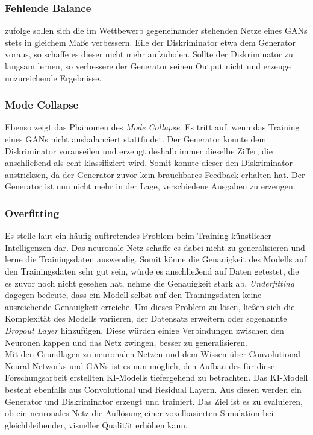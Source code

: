 \subsubsection*{Fehlende Balance}
\citet[67]{tariq_gan} zufolge sollen sich die im Wettbewerb gegeneinander stehenden Netze eines GANs stets in gleichem Maße verbessern. Eile der Diskriminator etwa dem Generator voraus, so schaffe es dieser nicht mehr aufzuholen. Sollte der Diskriminator zu langsam lernen, so verbessere der Generator seinen Output nicht und erzeuge unzureichende Ergebnisse.

\subsubsection*{Mode Collapse}
Ebenso zeigt \citet[95]{tariq_gan} das Phänomen des \textit{Mode Collapse}. Es tritt auf, wenn das Training eines GANs nicht ausbalanciert stattfindet. Der Generator konnte dem Diskriminator vorauseilen und erzeugt deshalb immer  dieselbe Ziffer, die anschließend als echt klassifiziert wird. Somit konnte dieser den Diskriminator austricksen, da der Generator zuvor kein brauchbares Feedback erhalten hat. Der Generator ist nun nicht mehr in der Lage, verschiedene Ausgaben zu erzeugen.

\subsubsection*{Overfitting} Es stelle laut \citet[]{baheti-2022} ein häufig auftretendes Problem beim Training künstlicher Intelligenzen dar. Das neuronale Netz schaffe es dabei nicht zu generalisieren und lerne die Trainingsdaten auswendig. Somit könne die Genauigkeit des Modells auf den Trainingsdaten sehr gut sein, würde es anschließend auf Daten getestet, die es zuvor noch nicht gesehen hat, nehme die Genauigkeit stark ab. \textit{Underfitting} dagegen bedeute, dass ein Modell selbst auf den Trainingsdaten keine ausreichende Genauigkeit erreiche. Um dieses Problem zu lösen, ließen sich die Komplexität des Modells variieren, der Datensatz erweitern oder sogenannte \textit{Dropout Layer} hinzufügen. Diese würden einige Verbindungen zwischen den Neuronen kappen und das Netz zwingen, besser zu generalisieren. \\

Mit den Grundlagen zu neuronalen Netzen und dem Wissen über Convolutional Neural Networks und GANs ist es nun möglich, den Aufbau des für diese Forschungsarbeit erstellten KI-Modells tiefergehend zu betrachten. Das KI-Modell besteht ebenfalls aus Convolutional und Residual Layern. Aus diesen werden ein Generator und Diskriminator erzeugt und trainiert. Das Ziel ist es zu evaluieren, ob ein neuronales Netz die Auflösung einer voxelbasierten Simulation bei gleichbleibender, visueller Qualität erhöhen kann.
